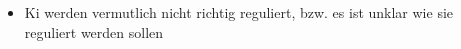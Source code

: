 \begin{itemize}
	\item Ki werden vermutlich nicht richtig reguliert, bzw. es ist unklar wie sie reguliert werden sollen
\end{itemize}